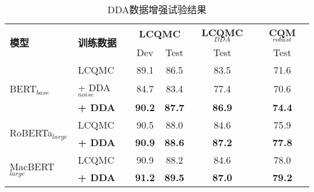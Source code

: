 \begin{table}
    \caption{DDA数据增强试验结果}
    \centering
    \newcommand{\tabincell}[2]{\begin{tabular}{@{}#1@{}}#2\end{tabular}}
    \begin{tabular}{l|l|cc|c|c}
    \toprule[0.7pt]
    \multirow{2}{*}{\textbf{模型}} & \multirow{2}{*}{\enspace \textbf{训练数据\enspace }} & \multicolumn{2}{c|}{\textbf{LCQMC}} & \;\textbf{LCQMC$_{DDA}$}\; & \;\textbf{CQM$_{robust}$}\; \\
    \cline{3-6}
    & & \enspace Dev\; & \; Test\enspace & Test & Test\\
    \midrule[0.7pt]

    \multirow{3}{*}{BERT$_{base}$} & \enspace LCQMC & 89.1 & 86.5 & 83.5 & 71.6 \\\cline{2-6}
    &\enspace + DDA$_{noise}$ & 84.7 & 83.4 & 77.4 & 70.6 \\
    &\enspace \textbf{+ DDA} & \textbf{90.2} & \textbf{87.7} & \textbf{86.9} & \textbf{74.4} \\
    \midrule[0.4pt]
    \multirow{2}{*}{RoBERTa$_{large}$} & \enspace LCQMC & 90.5 & 88.0 & 84.6 & 75.9 \\
    &\enspace \textbf{+ DDA} & \textbf{90.9} & \textbf{88.6} & \textbf{87.2} & \textbf{77.8} \\
    \midrule[0.4pt]
    \multirow{2}{*}{MacBERT$_{large}$\quad} & \enspace LCQMC & 90.9 & 88.2 & 84.6 & 78.0 \\
    &\enspace \textbf{+ DDA} & \textbf{91.2} & \textbf{89.5} & \textbf{87.0} & \textbf{79.2} \\
    \bottomrule[0.7pt]
    \end{tabular}
    \label{table4-3}
\end{table}